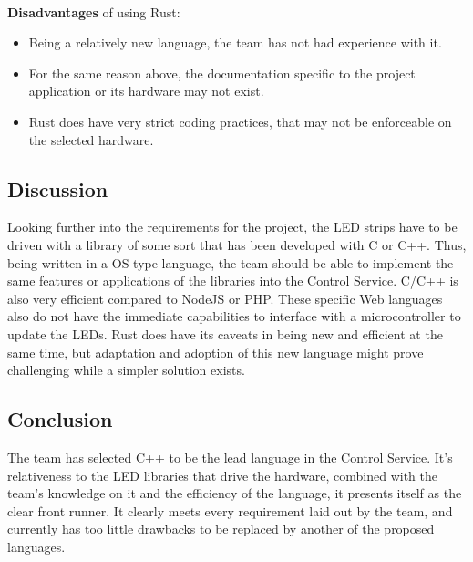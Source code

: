 		\noindent \\ \textbf{Disadvantages} of using Rust:
		\begin{itemize}
			\item Being a relatively new language, the team has not had experience with it.
			\item For the same reason above, the documentation specific to the project application or its hardware may not exist.
			\item Rust does have very strict coding practices, that may not be enforceable on the selected hardware.
		\end{itemize}


		\subsection{Discussion}
		Looking further into the requirements for the project, the LED strips have to be driven with a library of some sort that has been developed with C or C++.  Thus, being written in a OS
		type language, the team should be able to implement the same features or applications of the libraries into the Control Service.  C/C++ is also very efficient compared to NodeJS or PHP.
		These specific Web languages also do not have the immediate capabilities to interface with a microcontroller to update the LEDs.  Rust does have its caveats in being new and efficient
		at the same time, but adaptation and adoption of this new language might prove challenging while a simpler solution exists.

		\subsection{Conclusion}
		The team has selected C++ to be the lead language in the Control Service.  It's relativeness to the LED libraries that drive the hardware, combined with the team's knowledge on it and
		the efficiency of the language, it presents itself as the clear front runner.  It clearly meets every requirement laid out by the team, and currently has too little drawbacks to be replaced
		by another of the proposed languages.
